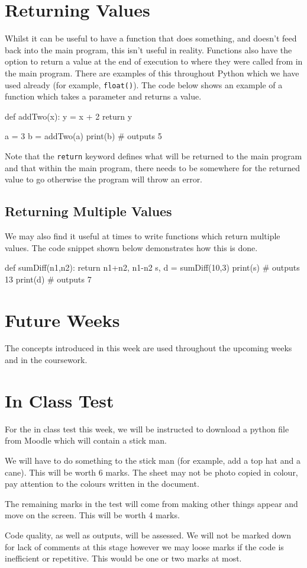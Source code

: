 \section*{Returning Values}
Whilst it can be useful to have a function that does something, and doesn't feed back into the main program, this isn't useful in reality. Functions also have the option to return a value at the end of execution to where they were called from in the main program. There are examples of this throughout Python which we have used already (for example, \verb|float()|). The code below shows an example of a function which takes a parameter and returns a value.
\begin{python}
def addTwo(x):
    y = x + 2
    return y

a = 3
b = addTwo(a)
print(b)  # outputs 5
\end{python}
Note that the \verb|return| keyword defines what will be returned to the main program and that within the main program, there needs to be somewhere for the returned value to go otherwise the program will throw an error.
\subsection*{Returning Multiple Values}
We may also find it useful at times to write functions which return multiple values. The code snippet shown below demonstrates how this is done.
\begin{python}
def sumDiff(n1,n2):
    return n1+n2, n1-n2
s, d = sumDiff(10,3)
print(s)  # outputs 13
print(d)  # outputs 7
\end{python}

\section*{Future Weeks}
The concepts introduced in this week are used throughout the upcoming weeks and in the coursework.

\section*{In Class Test}
For the in class test this week, we will be instructed to download a python file from Moodle which will contain a stick man. 

We will have to do something to the stick man (for example, add a top hat and a cane). This will be worth 6 marks. The sheet may not be photo copied in colour, pay attention to the colours written in the document. 

The remaining marks in the test will come from making other things appear and move on the screen. This will be worth 4 marks.

Code quality, as well as outputs, will be assessed. We will not be marked down for lack of comments at this stage however we may loose marks if the code is inefficient or repetitive. This would be one or two marks at most.